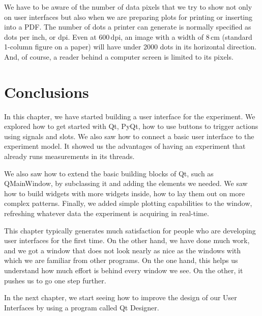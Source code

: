 We have to be aware of the number of data pixels that we try to show not only on user interfaces but also when we are preparing plots for printing or inserting into a PDF. The number of dots a printer can generate is normally specified as dots per inch, or dpi. Even at $600\,\textrm{dpi}$, an image with a width of $8\,\textrm{cm}$ (standard 1-column figure on a paper) will have under 2000 dots in its horizontal direction. And, of course, a reader behind a computer screen is limited to its pixels.

\section{Conclusions}\label{sec:basic-gui-conclusions}
In this chapter, we have started building a user interface for the experiment. We explored how to get started with Qt, PyQt, how to use buttons to trigger actions using signals and slots. We also saw how to connect a basic user interface to the experiment model. It showed us the advantages of having an experiment that already runs measurements in its threads.

We also saw how to extend the basic building blocks of Qt, such as QMainWindow, by subclassing it and adding the elements we needed. We saw how to build widgets with more widgets inside, how to lay them out on more complex patterns. Finally, we added simple plotting capabilities to the window, refreshing whatever data the experiment is acquiring in real-time.

This chapter typically generates much satisfaction for people who are developing user interfaces for the first time. On the other hand, we have done much work, and we got a window that does not look nearly as nice as the windows with which we are familiar from other programs. On the one hand, this helps us understand how much effort is behind every window we see. On the other, it pushes us to go one step further.

In the next chapter, we start seeing how to improve the design of our User Interfaces by using a program called Qt Designer.
